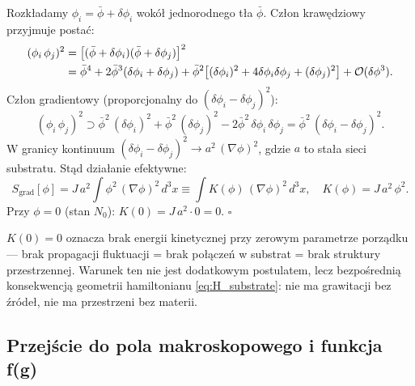 \begin{dowod}
Rozkładamy $\phi_i = \bar\phi + \delta\phi_i$ wokół jednorodnego tła
$\bar\phi$. Człon krawędziowy przyjmuje postać:
\begin{align}
  (\phi_i\,\phi_j)^2
    &= \bigl[(\bar\phi+\delta\phi_i)(\bar\phi+\delta\phi_j)\bigr]^2 \notag\\
    &= \bar\phi^4
      + 2\bar\phi^3(\delta\phi_i + \delta\phi_j)
      + \bar\phi^2\bigl[(\delta\phi_i)^2 + 4\delta\phi_i\delta\phi_j
        + (\delta\phi_j)^2\bigr]
      + \mathcal{O}(\delta\phi^3).
\end{align}
Człon gradientowy (proporcjonalny do $(\delta\phi_i - \delta\phi_j)^2$):
\begin{equation}
  (\phi_i\,\phi_j)^2 \supset
  \bar\phi^2\,(\delta\phi_i)^2 + \bar\phi^2\,(\delta\phi_j)^2
  - 2\bar\phi^2\,\delta\phi_i\,\delta\phi_j
  = \bar\phi^2\,(\delta\phi_i - \delta\phi_j)^2.
\end{equation}
W granicy kontinuum $(\delta\phi_i - \delta\phi_j)^2 \to a^2\,(\nabla\phi)^2$,
gdzie $a$ to stała sieci substratu. Stąd działanie efektywne:
\begin{equation}
  S_\mathrm{grad}[\phi] = J\,a^2\!\int \phi^2\,(\nabla\phi)^2\,d^3x
  \equiv \int K(\phi)\,(\nabla\phi)^2\,d^3x,
  \quad K(\phi) = J\,a^2\,\phi^2.
\end{equation}
Przy $\phi = 0$ (stan $N_0$): $K(0) = J\,a^2\cdot 0 = 0$. \hfill$\square$
\end{dowod}

\begin{uwaga}[Interpretacja fizyczna K(0) = 0]
\label{rem:K0_physical}
$K(0) = 0$ oznacza brak energii kinetycznej przy zerowym parametrze
porządku — brak propagacji fluktuacji = brak połączeń w substrat =
brak struktury przestrzennej. Warunek ten nie jest dodatkowym postulatem,
lecz bezpośrednią konsekwencją geometrii hamiltonianu
\eqref{eq:H_substrate}: nie ma grawitacji bez źródeł, nie ma
przestrzeni bez materii.
\end{uwaga}

\subsection{Przejście do pola makroskopowego i funkcja f(g)}
\label{subsec:K_to_f}

